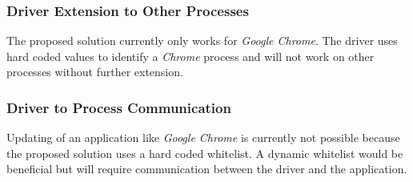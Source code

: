 \subsubsection{Driver Extension to Other Processes}
The proposed solution currently only works for \emph{Google Chrome}. The driver uses hard coded values to identify a \emph{Chrome} process and will not work on other processes without further extension.
\subsubsection{Driver to Process Communication}
Updating of an application like \emph{Google Chrome} is currently not possible because the proposed solution uses a hard coded whitelist. A dynamic whitelist would be beneficial but will require communication between the driver and the application.